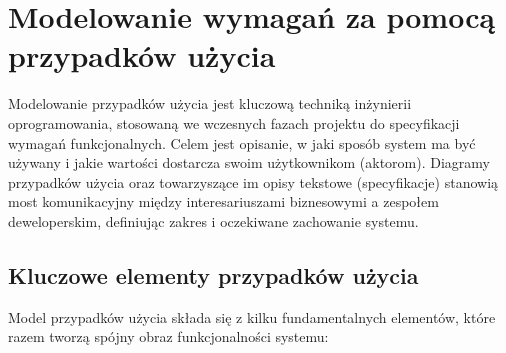 \documentclass[a4paper,12pt]{article}
\begin{document}
\section{Modelowanie wymagań za pomocą przypadków użycia}

Modelowanie przypadków użycia jest kluczową techniką inżynierii oprogramowania, stosowaną we wczesnych fazach projektu do specyfikacji wymagań funkcjonalnych. Celem jest opisanie, w jaki sposób system ma być używany i jakie wartości dostarcza swoim użytkownikom (aktorom). Diagramy przypadków użycia oraz towarzyszące im opisy tekstowe (specyfikacje) stanowią most komunikacyjny między interesariuszami biznesowymi a zespołem deweloperskim, definiując zakres i oczekiwane zachowanie systemu.

\subsection{Kluczowe elementy przypadków użycia}

Model przypadków użycia składa się z kilku fundamentalnych elementów, które razem tworzą spójny obraz funkcjonalności systemu:
\end{document}
